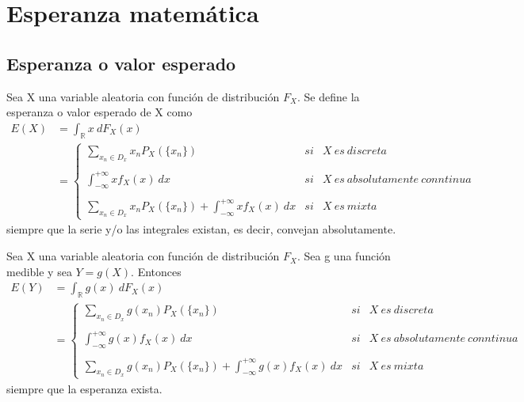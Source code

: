 \chapter{Esperanza matemática}

\section{Esperanza o valor esperado}

\begin{defi}
    Sea X una variable aleatoria con función de distribución $F_X$. Se define la esperanza o valor esperado de X como
    \begin{align*}
        E(X) & = \int_{\mathbb{R}}{x \ dF_X(x)}                                                                                                    \\
             & =\left\{ \begin{array}{lcc}
                            \sum_{x_n \in D_x}{x_nP_X(\{x_n\})}                                          & si & X \ es\  discreta                   \\ \\
                            \int_{-\infty}^{+\infty}{xf_X(x) \ dx}                                       & si & X \ es \ absolutamente \  conntinua \\ \\
                            \sum_{x_n \in D_x}{x_nP_X(\{x_n\})} + \int_{-\infty}^{+\infty}{xf_X(x) \ dx} & si & X \ es \ mixta
                        \end{array}
        \right.
    \end{align*}
    siempre que la serie y/o las integrales existan, es decir, convejan absolutamente.
\end{defi}

\begin{prop}
    Sea X una variable aleatoria con función de distribución $F_X$. Sea g una función medible y sea $Y = g(X)$. Entonces
    \begin{align*}
        E(Y) & = \int_{\mathbb{R}}{g(x) \ dF_X(x)}                                                                                                       \\
             & =\left\{ \begin{array}{lcc}
                            \sum_{x_n \in D_x}{g(x_n)P_X(\{x_n\})}                                             & si & X \ es\  discreta                   \\ \\
                            \int_{-\infty}^{+\infty}{g(x)f_X(x) \ dx}                                          & si & X \ es \ absolutamente \  conntinua \\ \\
                            \sum_{x_n \in D_x}{g(x_n)P_X(\{x_n\})} + \int_{-\infty}^{+\infty}{g(x)f_X(x) \ dx} & si & X \ es \ mixta
                        \end{array}
        \right.
    \end{align*}
    siempre que la esperanza exista.
\end{prop}

